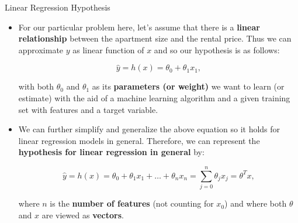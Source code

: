 \documentclass[document.tex]{subfiles}
\begin{document}
    \begin{frame}{Linear Regression Hypothesis}
        \begin{itemize}
            \item For our particular problem here, let's assume that there is a \textbf{linear relationship} between the apartment size and the rental price. Thus we can approximate $y$ as linear function of $x$ and so our hypothesis is as follows:
            
            $$\hat y = h(x) = \theta_0 + \theta_1x_1,$$
            
            with both $\theta_0$ and $\theta_1$ as its \textbf{parameters (or weight)} we want to learn (or estimate) with the aid of a machine learning algorithm and a given training set with features and a target variable.
            \item We can further simplify and generalize the above equation so it holds for linear regression models in general. Therefore, we can represent the \textbf{hypothesis for linear regression in general} by:
            
            $$\hat y = h(x) = \theta_0 + \theta_1x_1 + \dots + \theta_nx_n = \sum_{j=0}^n \theta_jx_j = \theta^Tx,$$
            
            where $n$ is the \textbf{number of features} (not counting for $x_0$) and where both $\theta$ and $x$ are viewed as \textbf{vectors}.
        \end{itemize}
    \end{frame}
\end{document}

